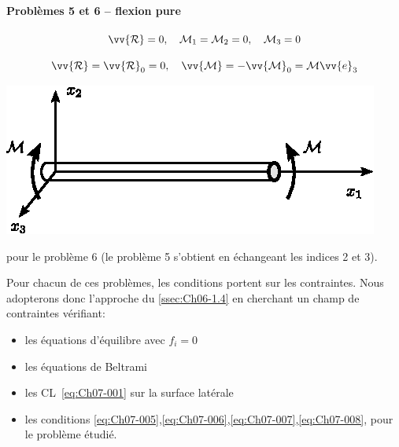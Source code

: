 \paragraph{Problèmes 5 et 6 -- flexion pure}
\begin{equation}
    \vv{\mathcal{R}} = 0 , \quad \mathcal{M}_1 = \mathcal{M}_2 = 0, \quad \mathcal{M}_3 = 0
    \label{eq:Ch07-012}
\end{equation}
\begin{multicols}{2}
    \begin{equation*}
        \vv{\mathcal{R}} = \vv{\mathcal{R}}_0 = 0, \quad \vv{\mathcal{M}} = -\vv{\mathcal{M}}_0 = \mathcal{M} \vv{e}_3
    \end{equation*}
    \columnbreak
    \begin{center}
        \includegraphics{../images/T1_Ch07-05}
    \end{center}
\end{multicols}
pour le problème 6 (le problème 5 s'obtient en échangeant les indices 2 et 3).

Pour chacun de ces problèmes, les conditions portent sur les contraintes.
Nous adopterons donc l'approche du \ref{ssec:Ch06-1.4} en cherchant un champ de contraintes vérifiant:
\begin{itemize}
    \item les équations d'équilibre avec $f_i=0$
    \item les équations de Beltrami
    \item les CL~\eqref{eq:Ch07-001} sur la surface latérale
    \item les conditions \eqref{eq:Ch07-005},\eqref{eq:Ch07-006},\eqref{eq:Ch07-007},\eqref{eq:Ch07-008}, pour le problème étudié.
\end{itemize}
